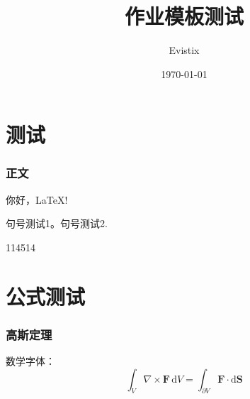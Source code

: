 \documentclass[theme = fancy, zihao = 5]{work-template}
\title{作业模板测试}
\author{Evistix}
\date{\today}
\begin{document}
\maketitle

\part{测试}
\section{正文}
你好，\LaTeX!\par
句号测试1。句号测试2.\par
114514

\part{公式测试}
\section{高斯定理}

数学字体：
\begin{equation}
    \int_V \nabla\times \symbf F\,\mathrm{d}V = \int_{\partial V} \symbf F\cdot\mathrm{d}\symbf S 
\end{equation}
\end{document}
